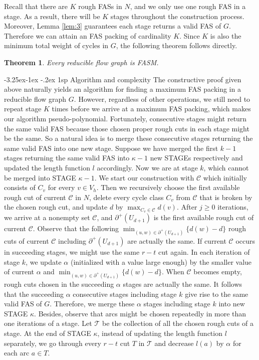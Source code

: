 \documentclass[11pt]{article}
\makeatletter
\newtheorem{theorem}{Theorem}[section]
\renewcommand\subsection{%
  \@startsection{subsection}{2}
                {\z@}%
                {-3.25ex\@plus -1ex \@minus -.2ex}%
                {1sp}%
                {\normalsize\bfseries}%
}
\makeatother
\begin{document}
Recall that there are $K$ rough FASs in $N$, and we only use one rough FAS in a stage. As a result, there will be $K$ stages throughout the construction process. Moreover, Lemma \ref{lem:3} guarantees each stage returns a valid FAS of $G$. Therefore we can attain an FAS packing of cardinality $K$. Since $K$ is also the minimum total weight of cycles in $G$, the following theorem follows directly.

\begin{theorem}
\label{thm:4}
Every reducible flow graph is FASM.
\end{theorem}

\subsection{Algorithm and complexity}
\label{sec:5}
The constructive proof given above naturally yields an algorithm for finding a maximum FAS packing in a reducible flow graph $G$. However, regardless of other operations, we still need to repeat stage $K$ times before we arrive at a maximum FAS packing, which makes our algorithm pseudo-polynomial. Fortunately, consecutive stages might return the same valid FAS because those chosen proper rough cuts in each stage might be the same. So a natural idea is to merge these consecutive stages returning the same valid FAS into one new stage.  
Suppose we have merged the first $k-1$ stages returning the same valid FAS into $\kappa-1$ new STAGEs respectively and updated the length function $l$ accordingly. Now we are at stage $k$, which cannot be merged into STAGE $\kappa-1$. We start our construction with $\mathcal{C}$ which initially consists of $C_v$ for every $v\in V_h$. Then we recursively choose the first available rough cut of current $\mathcal{C}$ in $N$, delete every cycle class $C_v$ from $\mathcal{C}$ that is broken by the chosen rough cut, and update $d$ by $\max_{C_v\in\mathcal{C}} d(v)$. After $j\geq 0$ iterations, we arrive at a nonempty set $\mathcal{C}$, and $\partial^+(U_{d+1})$ is the first available rough cut of current $\mathcal{C}$. Observe that the following $\min_{(u,w)\in\partial^+(U_{d+1})}\{d(w)-d\}$ rough cuts of current $\mathcal{C}$ including $\partial^+(U_{d+1})$ are actually the same. If current $\mathcal{C}$ occurs in succeeding stages, we might use the same $r-t$ cut again. In each iteration of stage $k$, we update $\alpha$ (initialized with a value large enough) by the smaller value of current $\alpha$ and $\min_{(u,w)\in\partial^+(U_{d+1})}\{d(w)-d\}$. When $\mathcal{C}$ becomes empty, rough cuts chosen in the succeeding $\alpha$ stages are actually the same. It follows that the succeeding $\alpha$ consecutive stages including stage $k$ give rise to the same valid FAS of $G$. Therefore, we merge these $\alpha$ stages including stage $k$ into new STAGE $\kappa$. Besides, observe that arcs might be chosen repeatedly in more than one iterations of a stage. Let $\mathcal{T}$ be the collection of all the chosen rough cuts of a stage. At the end of STAGE $\kappa$, instead of updating the length function $l$ separately, we go through every $r-t$ cut $T$ in $\mathcal{T}$ and decrease $l(a)$ by $\alpha$ for each arc $a\in T$.
\end{document}
